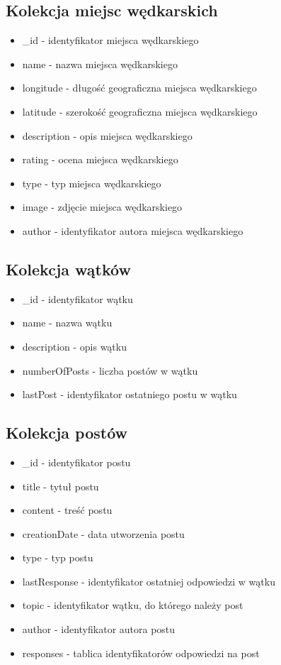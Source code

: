 \documentclass{article}
\begin{document}
\subsection{Kolekcja miejsc wędkarskich}
\begin{itemize}
  \item \_id - identyfikator miejsca wędkarskiego
  \item name - nazwa miejsca wędkarskiego
  \item longitude - długość geograficzna miejsca wędkarskiego
  \item latitude - szerokość geograficzna miejsca wędkarskiego
  \item description - opis miejsca wędkarskiego
  \item rating - ocena miejsca wędkarskiego
  \item type - typ miejsca wędkarskiego
  \item image - zdjęcie miejsca wędkarskiego
  \item author - identyfikator autora miejsca wędkarskiego
\end{itemize}
\subsection{Kolekcja wątków}
\begin{itemize}
  \item \_id - identyfikator wątku
  \item name - nazwa wątku
  \item description - opis wątku
  \item numberOfPosts - liczba postów w wątku
  \item lastPost - identyfikator ostatniego postu w wątku
\end{itemize}
\subsection{Kolekcja postów}
\begin{itemize}
  \item \_id - identyfikator postu
  \item title - tytuł postu
  \item content - treść postu
  \item creationDate - data utworzenia postu
  \item type - typ postu
  \item lastResponse - identyfikator ostatniej odpowiedzi w wątku
  \item topic - identyfikator wątku, do którego należy post
  \item author - identyfikator autora postu
  \item responses - tablica identyfikatorów odpowiedzi na post
\end{itemize}
\end{document}
